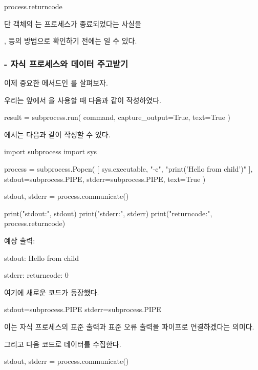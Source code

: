 \begin{dhkzsh}
process.returncode
\end{dhkzsh}

단  객체의 는 프로세스가 종료되었다는 사실을

,  등의 방법으로 확인하기 전에는 일 수 있다.

\subsubsection{ - 자식 프로세스와 데이터 주고받기}

이제 중요한 메서드인 를 살펴보자.

우리는 앞에서 을 사용할 때 다음과 같이 작성하였다.

\begin{dhkcode}
result = subprocess.run(
    command,
    capture_output=True,
    text=True
)
\end{dhkcode}

에서는 다음과 같이 작성할 수 있다.

\begin{dhkcode}
import subprocess
import sys

process = subprocess.Popen(
    [
        sys.executable,
        "-c",
        "print('Hello from child')"
    ],
    stdout=subprocess.PIPE,
    stderr=subprocess.PIPE,
    text=True
)

stdout, stderr = process.communicate()

print("stdout:", stdout)
print("stderr:", stderr)
print("returncode:", process.returncode)
\end{dhkcode}

예상 출력:

\begin{dhkzsh}
stdout: Hello from child

stderr:
returncode: 0
\end{dhkzsh}

여기에 새로운 코드가 등장했다.

\begin{dhkcode}
stdout=subprocess.PIPE
stderr=subprocess.PIPE
\end{dhkcode}

이는 자식 프로세스의 표준 출력과 표준 오류 출력을 파이프로 연결하겠다는 의미다.

그리고 다음 코드로 데이터를 수집한다.

\begin{dhkcode}
stdout, stderr = process.communicate()
\end{dhkcode}

